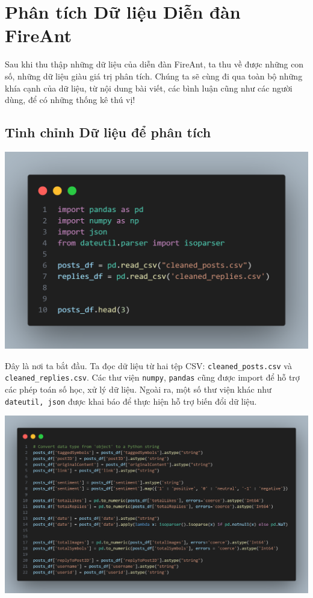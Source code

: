 \chapter{Phân tích Dữ liệu Diễn đàn FireAnt}

Sau khi thu thập những dữ liệu của diễn đàn FireAnt, ta thu về được những con số, những dữ liệu giàu giá trị phân tích. Chúng ta sẽ cùng đi qua toàn bộ những khía cạnh của dữ liệu, từ nội dung bài viết, các bình luận cũng như các người dùng, để có những thống kê thú vị!

\section{Tinh chỉnh Dữ liệu để phân tích}
\begin{center}
    \includegraphics[width=0.5\linewidth]{images/code-3.1.png}
\end{center}

Đây là nơi ta bắt đầu. Ta đọc dữ liệu từ hai tệp CSV: \texttt{cleaned\_posts.csv} và \texttt{cleaned\_replies.csv}.
Các thư viện \texttt{numpy}, \texttt{pandas} cũng được import để hỗ trợ các phép toán số học, xử lý dữ liệu.
Ngoài ra, một số thư viện khác như \texttt{dateutil, json} được khai báo để thực hiện hỗ trợ biến đổi dữ liệu.

\begin{center}
    \includegraphics[width=0.9\linewidth]{images/code-3.2.png}
\end{center}

